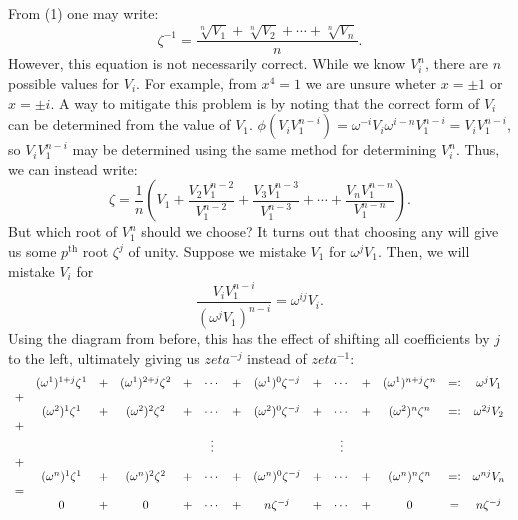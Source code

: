 \documentclass{article}
\renewcommand\({\left(}
\renewcommand\){\right)}
\begin{document}
\vspace{6mm}
From (1) one may write: \[\zeta^{-1}=\frac{\sqrt[n]{V_1}+\sqrt[n]{V_2}+\cdots+\sqrt[n]{V_n}}{n}.\]
However, this equation is not necessarily correct. While we know $V_i^n$, there are $n$ possible values for $V_i$. For example, from $x^4=1$ we are unsure wheter $x=\pm 1$ or $x=\pm i$. A way to mitigate this problem is by noting that the correct form of $V_i$ can be determined from the value of $V_1$. $\phi(V_iV_1^{n-i})=\omega^{-i}V_i\omega^{i-n}V_1^{n-i}=V_iV_1^{n-i}$, so $V_iV_1^{n-i}$ may be determined using the same method for determining $V_i^n$. Thus, we can instead write: \[\zeta=\frac{1}{n}\left(V_1+\frac{V_2V_1^{n-2}}{V_1^{n-2}}+\frac{V_3V_1^{n-3}}{V_1^{n-3}}+\cdots+\frac{V_nV_1^{n-n}}{V_1^{n-n}}\right).\]
But which root of $V_1^n$ should we choose? It turns out that choosing any will give us some $p^\text{th}$ root $\zeta^j$ of unity. Suppose we mistake $V_1$ for $\omega^jV_1$. Then, we will mistake $V_i$ for \[\frac{V_iV_1^{n-i}}{(\omega^jV_1)^{n-i}}=\omega^{ij}V_i.\] Using the diagram from before, this has the effect of shifting all coefficients by $j$ to the left, ultimately giving us $zeta^{-j}$ instead of $zeta^{-1}$:
\begin{align*}
    \begin{array}{cccccccccccccc}
        &(\omega^1)^{1+j}\zeta^1&+&(\omega^1)^{2+j}\zeta^2&+&\cdots&+&(\omega^1)^{0}\zeta^{-j}&+&\cdots&+&(\omega^1)^{n+j}\zeta^n&=\vcentcolon&\omega^{j}V_1\\
        +\\
        &(\omega^2)^1\zeta^1&+&(\omega^2)^2\zeta^2&+&\cdots&+&(\omega^2)^{0}\zeta^{-j}&+&\cdots&+&(\omega^2)^n\zeta^n&=\vcentcolon&\omega^{2j}V_2\\
        +\\
        &&&&&\vdots&&&&\vdots\\
        +\\
        &(\omega^n)^1\zeta^1&+&(\omega^n)^2\zeta^2&+&\cdots&+&(\omega^n)^{0}\zeta^{-j}&+&\cdots&+&(\omega^n)^n\zeta^n&=\vcentcolon&\omega^{nj}V_n\\
        =\\
        &0&+&0&+&\cdots&+&n\zeta^{-j}&+&\cdots&+&0&=&n\zeta^{-j}
    \end{array}
\end{align*}

\newpage
\end{document}
